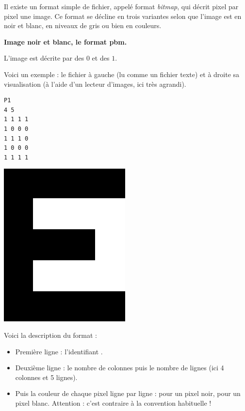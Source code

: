 \documentclass[11pt,class=report,crop=false]{standalone}
\begin{document}
\begin{cours}


Il existe un format simple de fichier, appelé format \emph{bitmap}, qui décrit pixel par pixel une image. Ce format se décline en trois variantes 
selon que l'image est en noir et blanc, en niveaux de gris ou bien en couleurs.

\medskip

\textbf{Image noir et blanc, le format \og{}pbm\fg{}.}

L'image est décrite par des $0$ et des $1$.

Voici un exemple : le fichier  à gauche (lu comme un fichier texte)  et à droite sa visualisation (à l'aide d'un lecteur d'images, ici très agrandi).
\begin{center}
\begin{minipage}{0.3\textwidth}
\begin{lstlisting}
P1
4 5
1 1 1 1
1 0 0 0
1 1 1 0
1 0 0 0
1 1 1 1
\end{lstlisting}
\end{minipage}
\begin{minipage}{0.3\textwidth}
\includegraphics[scale=0.2]{ecran-cours-image_nb}
\end{minipage}
\end{center}

Voici la description du format :
\begin{itemize}
  \item Première ligne : l'identifiant .
  \item Deuxième ligne : le nombre de colonnes puis le nombre de lignes (ici 4 colonnes et 5 lignes).
  \item Puis la couleur de chaque pixel ligne par ligne :  pour un pixel noir,  pour un pixel blanc. Attention : c'est contraire à la convention habituelle !
\end{itemize}  
  

\end{cours}
\end{document}
